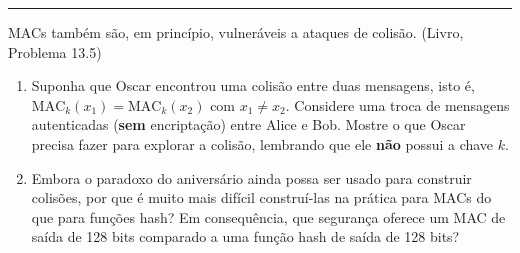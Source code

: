 \documentclass[11pt,a4paper]{article}
\newcommand{\livro}[1]{{\footnotesize\color{black!50}(Livro, Problema #1)}}
\newcommand{\exercicio}[1]{%
    \Needspace{8\baselineskip}%
    \par\vspace{1.2em}
    \noindent
    {\color{black!55}\rule[-0.25em]{3pt}{1.6em}}%
    \hspace{0.6em}{\Large\bfseries Exerc\'{i}cio #1}
    \par\vspace{-0.4em}
    \noindent{\color{black!35}\rule{\textwidth}{0.4pt}}
    \par\vspace{0.35em}
}
\begin{document}
\exercicio{4}
MACs tamb\'{e}m s\~{a}o, em princ\'{i}pio, vulner\'{a}veis a ataques de colis\~{a}o. \livro{13.5}
\begin{enumerate}[label=(\alph*)]
    \item Suponha que Oscar encontrou uma colis\~{a}o entre duas mensagens, isto \'{e}, $\text{MAC}_k(x_1) = \text{MAC}_k(x_2)$ com $x_1 \neq x_2$. Considere uma troca de mensagens autenticadas (\textbf{sem} encripta\c{c}\~{a}o) entre Alice e Bob. Mostre o que Oscar precisa fazer para explorar a colis\~{a}o, lembrando que ele \textbf{n\~{a}o} possui a chave $k$.
    \item Embora o paradoxo do anivers\'{a}rio ainda possa ser usado para construir colis\~{o}es, por que \'{e} muito mais dif\'{i}cil constru\'{i}-las na pr\'{a}tica para MACs do que para fun\c{c}\~{o}es hash? Em consequ\^{e}ncia, que seguran\c{c}a oferece um MAC de sa\'{i}da de 128 bits comparado a uma fun\c{c}\~{a}o hash de sa\'{i}da de 128 bits?
\end{enumerate}
\end{document}
